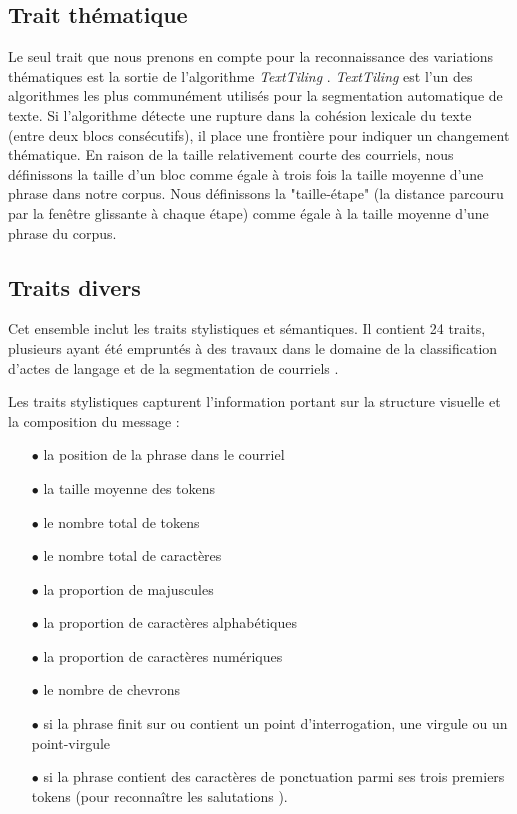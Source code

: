\subsection{Trait thématique}

Le seul trait que nous prenons en compte pour la reconnaissance des variations thématiques est la sortie de l'algorithme \textit{TextTiling} \cite{hearst1997texttiling}. \textit{TextTiling} est l'un des algorithmes les plus communément utilisés pour la segmentation automatique de texte. Si l'algorithme détecte une rupture dans la cohésion lexicale du texte (entre deux blocs consécutifs), il place une frontière pour indiquer un changement thématique. En raison de la taille relativement courte des courriels, nous définissons la taille d'un bloc comme égale à trois fois la taille moyenne d'une phrase dans notre corpus. Nous définissons la "taille-étape" (la distance parcouru par la fenêtre glissante à chaque étape) comme égale à la taille moyenne d'une phrase du corpus.

\subsection{Traits divers}

Cet ensemble inclut les traits stylistiques et sémantiques. Il contient 24 traits, plusieurs ayant été empruntés à des travaux dans le domaine de la classification d'actes de langage \cite{qadir2011classifying} et de la segmentation de courriels \cite{lampert2009segmenting}. 

Les traits stylistiques capturent l'information portant sur la structure visuelle et la composition du message : 

\begin{itemize}
	\item[$\bullet$] la position de la phrase dans le courriel
	\item[$\bullet$] la taille moyenne des tokens
	\item[$\bullet$] le nombre total de tokens 
	\item[$\bullet$] le nombre total de caractères
	\item[$\bullet$] la proportion de majuscules
	\item[$\bullet$] la proportion de caractères alphabétiques
	\item[$\bullet$] la proportion de caractères numériques
	\item[$\bullet$] le nombre de chevrons
	\item[$\bullet$] si la phrase finit sur ou contient un point d'interrogation, une virgule ou un point-virgule
	\item[$\bullet$] si la phrase contient des caractères de ponctuation parmi ses trois premiers tokens (pour reconnaître les salutations \cite{qadir2011classifying}).
\end{itemize}

